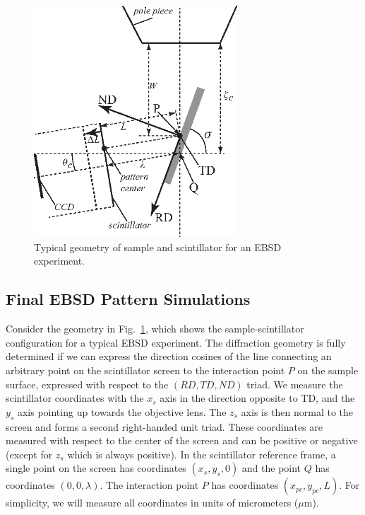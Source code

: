 \documentclass[DIV=calc, paper=letter, fontsize=11pt]{scrartcl}	 %
\begin{document}
\begin{figure}[t]
\centering
\includegraphics[width=3in]{figs/geometry}
\caption{Typical geometry of sample and scintillator for an EBSD experiment.} \label{fig:geometry}
\end{figure}



\subsection{Final EBSD Pattern Simulations \label{sec:EBSP}}
Consider the geometry in Fig.~\ref{fig:geometry}, which shows the sample-scintillator configuration 
for a typical EBSD experiment.  The diffraction geometry is fully determined if we can express the direction cosines of the line connecting
an arbitrary point on the scintillator screen to the interaction point $P$ on the sample surface, expressed with 
respect to the $(RD,TD,ND)$  triad.  We measure the scintillator coordinates with the $x_s$ axis in the direction 
opposite to TD, and the $y_s$ axis pointing up towards the objective lens.   The $z_s$ axis is then 
normal to the screen and forms a second right-handed unit triad.  These coordinates are measured with 
respect to the center of the screen and can be positive or negative (except for $z_s$ which is always positive).
In the scintillator reference frame, a single point on the screen has coordinates $(x_s,y_s,0)$ and the 
point $Q$ has coordinates $(0,0,\lambda)$.  The interaction point $P$ has coordinates $(x_{pc},y_{pc},L)$.
For simplicity, we will measure all coordinates in units of micrometers ($\mu$m).
\end{document}
